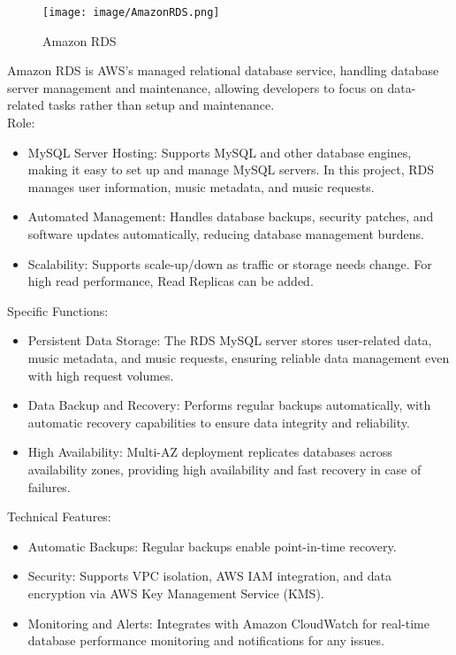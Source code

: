 \documentclass[conference]{IEEEtran}
\begin{document}
\begin{figure}[h!]
    \centering
    \texttt{[image: image/AmazonRDS.png]}
    \caption{Amazon RDS}
    \label{fig:enter-label}
\end{figure}

\noindent Amazon RDS is AWS’s managed relational database service, handling database server management and maintenance, allowing developers to focus on data-related tasks rather than setup and maintenance.\\

Role: 
\begin{itemize}
    \item MySQL Server Hosting: Supports MySQL and other database engines, making it easy to set up and manage MySQL servers. In this project, RDS manages user information, music metadata, and music requests.\\
    \item Automated Management: Handles database backups, security patches, and software updates automatically, reducing database management burdens.\\
    \item Scalability: Supports scale-up/down as traffic or storage needs change. For high read performance, Read Replicas can be added.\\
\end{itemize}

Specific Functions:
\begin{itemize}
    \item Persistent Data Storage: The RDS MySQL server stores user-related data, music metadata, and music requests, ensuring reliable data management even with high request volumes.\\
    \item Data Backup and Recovery: Performs regular backups automatically, with automatic recovery capabilities to ensure data integrity and reliability.\\
    \item High Availability: Multi-AZ deployment replicates databases across availability zones, providing high availability and fast recovery in case of failures.\\
\end{itemize}

Technical Features:
\begin{itemize}
    \item Automatic Backups: Regular backups enable point-in-time recovery.\\
    \item Security: Supports VPC isolation, AWS IAM integration, and data encryption via AWS Key Management Service (KMS).\\
    \item Monitoring and Alerts: Integrates with Amazon CloudWatch for real-time database performance monitoring and notifications for any issues.\\
\end{itemize}
\end{document}
